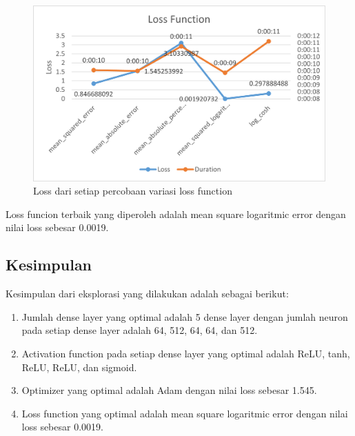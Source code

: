\documentclass[a4, 12px]{article}
\theoremstyle{definition}
\theoremstyle{remark}
\begin{document}
\begin{figure}[!h]
	\centering
	\includegraphics[width=0.7\linewidth]{src/R5}
	\caption{Loss dari setiap percobaan variasi loss function}
	\label{fig:R5}
\end{figure}

Loss funcion terbaik yang diperoleh adalah mean square logaritmic error dengan nilai loss sebesar 0.0019.

\subsection{Kesimpulan}
Kesimpulan dari eksplorasi yang dilakukan adalah sebagai berikut:
\begin{enumerate}[noitemsep]
	\item Jumlah dense layer yang optimal adalah 5 dense layer dengan jumlah neuron pada setiap dense layer adalah 64, 512, 64, 64, dan 512.
	\item Activation function pada setiap dense layer yang optimal adalah ReLU, tanh, ReLU, ReLU, dan sigmoid.
	\item Optimizer yang optimal adalah Adam dengan nilai loss sebesar 1.545.
	\item Loss function yang optimal adalah mean square logaritmic error dengan nilai loss sebesar 0.0019.
\end{enumerate}



\end{document}
